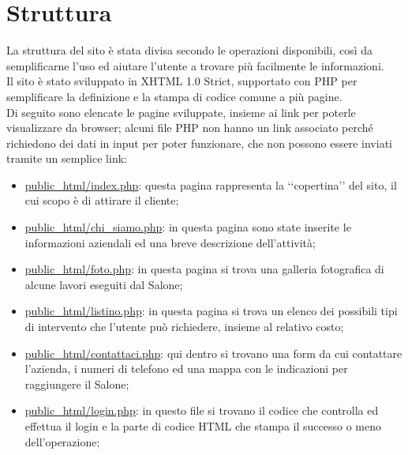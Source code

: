 \section{Struttura}{
	La struttura del sito è stata divisa secondo le operazioni disponibili, così da semplificarne l'uso ed aiutare l'utente a trovare più facilmente le informazioni.
	\\
	Il sito è stato sviluppato in XHTML 1.0 Strict, supportato con PHP per semplificare la definizione e la stampa di codice comune a più pagine.
	\\
	Di seguito sono elencate le pagine sviluppate, insieme ai link per poterle visualizzare da browser; alcuni file PHP non hanno un link associato perché richiedono dei dati in input per poter funzionare, che non possono essere inviati tramite un semplice link:
	\begin{itemize}\itemsep1pt
		\item \href{http://tecnologie-web.studenti.math.unipd.it/tecweb/~pgabelli/}{public\_html/index.php}: questa pagina rappresenta la ‘‘copertina’’ del sito, il cui scopo è di attirare il cliente;
		\item \href{http://tecnologie-web.studenti.math.unipd.it/tecweb/~pgabelli/public\_html/chi\_siamo.php}{public\_html/chi\_siamo.php}: in questa pagina sono state inserite le informazioni aziendali ed una breve descrizione dell'attività;
		\item \href{http://tecnologie-web.studenti.math.unipd.it/tecweb/~pgabelli/public\_html/foto.php}{public\_html/foto.php}: in questa pagina si trova una galleria fotografica di alcune lavori eseguiti dal Salone;
		\item \href{http://tecnologie-web.studenti.math.unipd.it/tecweb/~pgabelli/public\_html/listino.php}{public\_html/listino.php}: in questa pagina si trova un elenco dei possibili tipi di intervento che l'utente può richiedere, insieme al relativo costo;
		\item \href{http://tecnologie-web.studenti.math.unipd.it/tecweb/~pgabelli/public\_html/contattaci.php}{public\_html/contattaci.php}: qui dentro si trovano una form da cui contattare l'azienda, i numeri di telefono ed una mappa con le indicazioni per raggiungere il Salone;
		\item \href{http://tecnologie-web.studenti.math.unipd.it/tecweb/~pgabelli/public\_html/login.php}{public\_html/login.php}: in questo file si trovano il codice che controlla ed effettua il login e la parte di codice HTML che stampa il successo o meno dell'operazione;

\end{itemize}}
